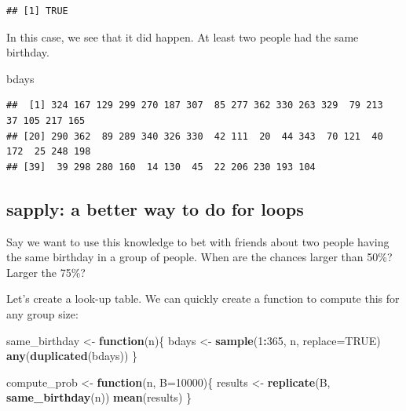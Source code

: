 \documentclass[
  openany]{book}
\newenvironment{Shaded}{\begin{snugshade}}{\end{snugshade}}
\newcommand{\ControlFlowTok}[1]{\textcolor[rgb]{0.13,0.29,0.53}{\textbf{#1}}}
\newcommand{\DataTypeTok}[1]{\textcolor[rgb]{0.13,0.29,0.53}{#1}}
\newcommand{\DecValTok}[1]{\textcolor[rgb]{0.00,0.00,0.81}{#1}}
\newcommand{\KeywordTok}[1]{\textcolor[rgb]{0.13,0.29,0.53}{\textbf{#1}}}
\newcommand{\NormalTok}[1]{#1}
\newcommand{\OperatorTok}[1]{\textcolor[rgb]{0.81,0.36,0.00}{\textbf{#1}}}
\newcommand{\OtherTok}[1]{\textcolor[rgb]{0.56,0.35,0.01}{#1}}
\newcommand{\StringTok}[1]{\textcolor[rgb]{0.31,0.60,0.02}{#1}}
\begin{document}
\begin{verbatim}
## [1] TRUE
\end{verbatim}

In this case, we see that it did happen. At least two people had the same birthday.

\begin{Shaded}
\begin{Highlighting}[]
\NormalTok{bdays}
\end{Highlighting}
\end{Shaded}

\begin{verbatim}
##  [1] 324 167 129 299 270 187 307  85 277 362 330 263 329  79 213  37 105 217 165
## [20] 290 362  89 289 340 326 330  42 111  20  44 343  70 121  40 172  25 248 198
## [39]  39 298 280 160  14 130  45  22 206 230 193 104
\end{verbatim}

\hypertarget{sapply-a-better-way-to-do-for-loops}{%
\subsection{sapply: a better way to do for loops}\label{sapply-a-better-way-to-do-for-loops}}

Say we want to use this knowledge to bet with friends about two people having the same birthday in a group of people. When are the chances larger than 50\%? Larger the 75\%?

Let's create a look-up table.
We can quickly create a function to compute this for any group size:

\begin{Shaded}
\begin{Highlighting}[]
\NormalTok{same_birthday <-}\StringTok{ }\ControlFlowTok{function}\NormalTok{(n)\{}
\NormalTok{  bdays <-}\StringTok{ }\KeywordTok{sample}\NormalTok{(}\DecValTok{1}\OperatorTok{:}\DecValTok{365}\NormalTok{, n, }\DataTypeTok{replace=}\OtherTok{TRUE}\NormalTok{)}
  \KeywordTok{any}\NormalTok{(}\KeywordTok{duplicated}\NormalTok{(bdays))}
\NormalTok{\}}

\NormalTok{compute_prob <-}\StringTok{ }\ControlFlowTok{function}\NormalTok{(n, }\DataTypeTok{B=}\DecValTok{10000}\NormalTok{)\{}
\NormalTok{  results <-}\StringTok{ }\KeywordTok{replicate}\NormalTok{(B, }\KeywordTok{same_birthday}\NormalTok{(n))}
  \KeywordTok{mean}\NormalTok{(results)}
\NormalTok{\}}
\end{Highlighting}
\end{Shaded}
\end{document}
